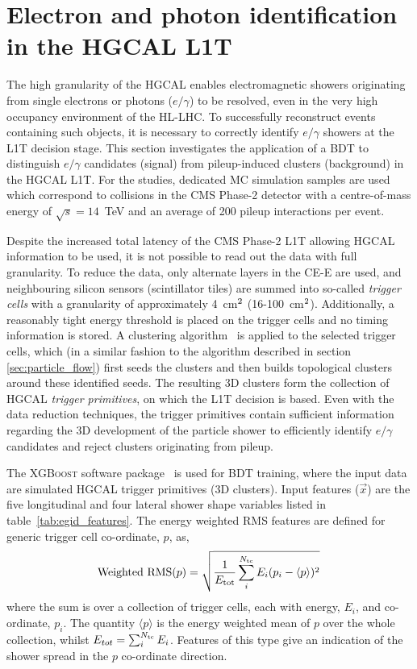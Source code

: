 \section{Electron and photon identification in the HGCAL L1T}\label{sec:egid}
The high granularity of the HGCAL enables electromagnetic showers originating from single electrons or photons ($e/\gamma$) to be resolved, even in the very high occupancy environment of the HL-LHC. To successfully reconstruct events containing such objects, it is necessary to correctly identify $e/\gamma$ showers at the L1T decision stage. This section investigates the application of a BDT to distinguish $e/\gamma$ candidates (signal) from pileup-induced clusters (background) in the HGCAL L1T. For the studies, dedicated MC simulation samples are used which correspond to collisions in the CMS Phase-2 detector with a centre-of-mass energy of $\sqrt{s}=14$~TeV and an average of 200 pileup interactions per event.

Despite the increased total latency of the CMS Phase-2 L1T allowing HGCAL information to be used, it is not possible to read out the data with full granularity. To reduce the data, only alternate layers in the CE-E are used, and neighbouring silicon sensors (scintillator tiles) are summed into so-called \textit{trigger cells} with a granularity of approximately 4~cm$^{\rm{2}}$ (16-100~cm$^{\rm{2}}$). Additionally, a reasonably tight energy threshold is placed on the trigger cells and no timing information is stored. A clustering algorithm~\cite{CERN-LHCC-2020-004} is applied to the selected trigger cells, which (in a similar fashion to the algorithm described in section \ref{sec:particle_flow}) first seeds the clusters and then builds topological clusters around these identified seeds. The resulting 3D clusters form the collection of HGCAL \textit{trigger primitives}, on which the L1T decision is based. Even with the data reduction techniques, the trigger primitives contain sufficient information regarding the 3D development of the particle shower to efficiently identify $e/\gamma$ candidates and reject clusters originating from pileup.

The \textsc{XGBoost} software package~\cite{10.1145/2939672.2939785} is used for BDT training, where the input data are simulated HGCAL trigger primitives (3D clusters). Input features ($\vec{x}$) are the five longitudinal and four lateral shower shape variables listed in table~\ref{tab:egid_features}. The energy weighted RMS features are defined for generic trigger cell co-ordinate, $p$, as,
\begin{equation}
    {\rm{Weighted}\,\,\rm{RMS}}(p) = \sqrt{\frac{1}{E_{\rm{tot}}}\sum^{N_{\rm{tc}}}_{i} E_i (p_i-\langle p \rangle)^2}\,
\end{equation}
\noindent
where the sum is over a collection of trigger cells, each with energy, $E_i$, and co-ordinate, $p_i$. The quantity $\langle p \rangle$ is the energy weighted mean of $p$ over the whole collection, whilst $E_{tot}=\sum^{N_{\rm{tc}}}_iE_i$. Features of this type give an indication of the shower spread in the $p$ co-ordinate direction.

